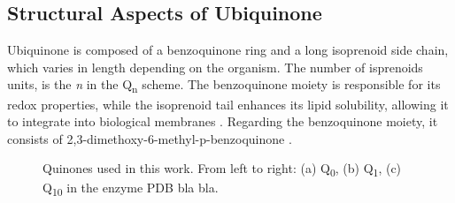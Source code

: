 \subsection{Structural Aspects of Ubiquinone}
Ubiquinone is composed of a benzoquinone ring and a long isoprenoid side chain, which varies in length depending on the organism. The number of isprenoids units, is the \textit{n} in the Q\textsubscript{n} scheme. The benzoquinone moiety is responsible for its redox properties, while the isoprenoid tail enhances its lipid solubility, allowing it to integrate into biological membranes \cite{ernster1995biochemical}. Regarding the benzoquinone moiety, it consists of 2,3-dimethoxy-6-methyl-p-benzoquinone \cite{ernster1995biochemical}.

\begin{figure}[h]
  \centering
  \caption[Quinone structures]{Quinones used in this work. From left to right: (a) Q\textsubscript{0}, (b) Q\textsubscript{1}, (c) Q\textsubscript{10} in the enzyme PDB bla bla.}
  \label{fig:QuinoneTypes}
\end{figure}

